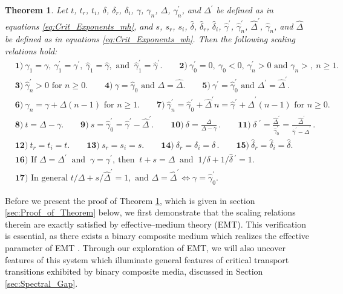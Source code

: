 \documentclass[english,12pt,jmp,graphicx]{revtex4-1}
\newtheorem{theorem}{Theorem}[section]
\newcommand{\gh}{\hat{\gamma}}
\newcommand{\Dh}{\hat{\Delta}}
\newcommand{\dha}{\hat{\delta}}
\begin{document}
\begin{theorem} \label{thm:Crit_Theory_m_w}
  Let $t$, $t_r$, $t_i$, $\delta$, $\delta_r$, $\delta_i$, $\gamma$, $\gamma_n$, $\Delta$, $\gamma_n^\prime$,
  and $\Delta^\prime$ be   defined as in equations \eqref{eq:Crit_Exponents_mh},
  and $s$, $s_r$, $s_i$, $\dha$, $\dha_r$, $\dha_i$, $\gh^\prime$, $\gh_n^\prime$,
  $\Dh^\prime$, $\gh_n$, and $\Dh$ be defined as in equations
  \eqref{eq:Crit_Exponents_wh}. Then the following scaling relations
  hold:
%  
  \begin{align*}   
   &\mathbf{1)} \ \gamma_1=\gamma, \ \gamma_1^\prime=\gamma^\prime, \ \gh_1=\gh, \text{ and } \ \gh_1^\prime=\gh^\prime. \qquad
     \mathbf{2)} \ \gamma_0^\prime=0, \ \gamma_0<0, \ \gamma_n^\prime>0 \text{ and } \gamma_n>, \ n\geq1.\\
   &\mathbf{3)} \ \gh_n^\prime>0 \text{ for } n\geq0. \qquad
   \mathbf{4)} \ \gamma=\gh_0 \text{ and } \Delta=\Dh. \qquad
   \mathbf{5)} \ \gamma^\prime=\gh_0^\prime \text{ and } \Delta^\prime=\Dh^\prime. \\
   &\mathbf{6)} \ \gamma_n=\gamma+\Delta(n-1) \text{ for } n\geq1. \qquad
   \mathbf{7)} \ \gh_n^\prime=\gh_0^\prime+\Dh^\prime n=\gh^\prime+\Dh^\prime(n-1) \text{ for } n\geq0. \\
   &\mathbf{8)} \ t=\Delta-\gamma. \qquad 
   \mathbf{9)} \ s=\gh_0^\prime=\gh^\prime-\Dh^\prime. \qquad
   \mathbf{10)} \ \delta=\frac{\Delta}{\Delta-\gamma}\,. \qquad
   \mathbf{11)} \ \dha\;^\prime=\frac{\Dh^\prime}{\gh_0^\prime}=\frac{\Dh^\prime}{\gh^\prime-\Dh^\prime}\,. \\
   &\mathbf{12)} \ t_r=t_i=t. \qquad
   \mathbf{13)} \ s_r=s_i=s. \qquad
   \mathbf{14)}  \ \delta_r=\delta_i=\delta\,. \qquad
   \mathbf{15)} \ \dha_r=\dha_i=\dha. \\
   &\mathbf{16)} \text{ If } \Delta=\Delta^\prime \ \text{ and } \ \gamma=\gamma^\prime, \ \text{
     then } \ t+s=\Delta \ \text{ and } \ 1/\delta+1/\dha\,^\prime=1.\\
   &\mathbf{17)} \text{ In general } t/\Delta+s/\Dh^\prime=1, \text{ and }  \Delta=\Dh^\prime\iff\gamma=\gh_0^\prime.
  \end{align*}
%  
\end{theorem}
%

Before we present the proof of Theorem \ref{thm:Crit_Theory_m_w},
which is given in section \ref{sec:Proof_of_Theorem} below, we first
demonstrate that the scaling relations therein are exactly satisfied by
effective--medium theory (EMT). This verification is essential, as
there exists a binary composite medium which realizes the effective
parameter of EMT \cite{MILTON:2002:TC}. Through our exploration of
EMT, we will also uncover features of this system which illuminate
general features of critical transport transitions exhibited by binary
composite media, discussed in Section \ref{sec:Spectral_Gap}. 
%
\end{document}
